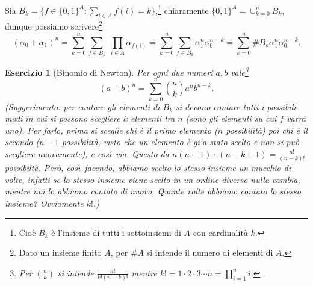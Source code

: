 \documentclass{amsart}
\newtheorem{es}[thm]{Esercizio}
\begin{document}
Sia $B_k=\{f\in\{0,1\}^A :\sum\limits_{i\in
A}f(i)=k\}$,\footnote{Cio\`e $B_k$ \`e l'insieme di tutti i
sottoinsiemi di $A$ con cardinalit\`a $k$.} chiaramente
$\{0,1\}^A=\cup_{k=0}^n B_k$, dunque possiamo scrivere\footnote{Dato
un insieme finito $A$, per $\# A$ si intende il numero di elementi di $A$.}
\[
(\alpha_0+\alpha_1)^n=\sum_{k=0}^n\sum_{f\in B_k}\;\prod_{i\in A}
\alpha_{f(i)}=\sum_{k=0}^n\sum_{f\in B_k} \alpha_1^n\alpha_0^{n-k}
=\sum_{k=0}^n\# B_k \alpha_1^n\alpha_0^{n-k}.
\]
\begin{es}[Binomio di Newton]
Per ogni due numeri $a,b$ vale\footnote{Per $\binom nk$ si intende
$\frac{n!}{k!(n-k)!}$ mentre $k!=1\cdot 2\cdot 3\cdots n=\prod_{i=1}^n
i$.}
\[
(a+b)^n=\sum_{k=0}^n\binom nk a^nb^{n-k}.
\]
(Suggerimento: per contare gli elementi di $B_k$  si devono contare
tutti i possibili modi in cui si possono scegliere $k$ elementi tra
$n$ (sono gli elementi su cui $f$ varr\'a uno). Per farlo, prima si sceglie
chi \`e il primo elemento ($n$ possibilit\`a) poi chi \`e il secondo
($n-1$ possibilit\`a, visto che un elemento \`e gi`a stato scelto e
non si pu\`o scegliere nuovamente), e cos\'\i\  via. Questo da
$n(n-1)\cdots (n-k+1)=\frac {n!}{(n-k)!}$ possibilt\`a. Per\`o,
cos\`\i\  facendo, abbiamo scelto lo stesso insieme un mucchio di
volte, infatti se lo stesso insieme viene scelto in un ordine diverso
nulla cambia, mentre noi lo abbiamo contato di nuovo. Quante volte
abbiamo contato lo stesso insieme? Ovviamente $k!$.)
\end{es}
\end{document}
